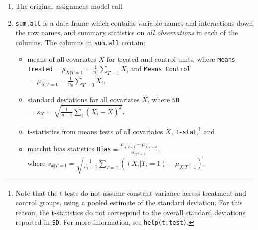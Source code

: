 \documentclass[oneside,letterpaper,titlepage]{article}
\begin{document}
\begin{enumerate}
\item The original assignment model call.
\item \texttt{sum.all} is a data frame which contains variable names
  and interactions down the row names, and summary statistics on
  \emph{all observations} in each of the columns.  The columns in
  \texttt{sum.all} contain:
  \begin{itemize}
  \item means of all covariates $X$ for treated and control units,
    where \texttt{Means Treated}$= \mu_{X|T=1} = \frac{1}{n_1}
    \sum_{T=1} X_i$ and \texttt{Means Control}$= \mu_{X|T=0} =
    \frac{1}{n_0} \sum_{T=0} X_i$,
  \item standard deviations for all covariates $X$, where
    \texttt{SD}$= s_X = \sqrt{\frac{1}{n-1} \sum_{i} (X_i -
      \overline{X})^2}$,
  \item t-statistics from means tests of all covariates $X$,
    \texttt{T-stat},\footnote{Note that the t-tests do not assume
      constant variance across treatment and control groups, using a
      pooled estimate of the standard deviation.  For this reason, the
      t-statistics do not correspond to the overall standard
      deviations reported in \texttt{SD}.  For more information, see
      \texttt{help(t.test)}.} and
  \item matchit bias statistics \texttt{Bias}$=\frac{\mu_{X|T=1} -
      \mu_{X|T=0}}{s_{x|T=1}}$, \\ where $s_{x|T=1} =
    \sqrt{\frac{1}{n_1-1} \sum_{T=1} ( (X_i|T_i=1) - \mu_{X|T=1})}$.
  \end{itemize}
  

\end{enumerate}
\end{document}
